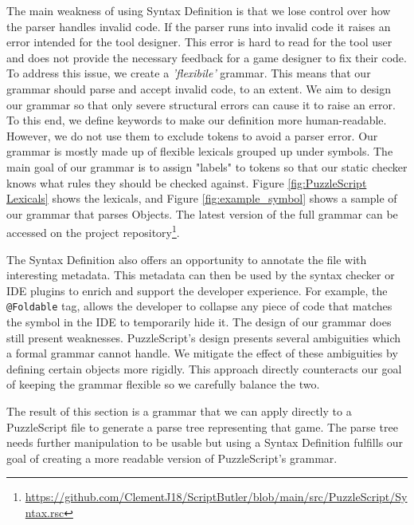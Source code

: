 The main weakness of using Syntax Definition is that we lose control over how the parser handles invalid code. If the parser runs into invalid code it raises an error intended for the tool designer. This error is hard to read for the tool user and does not provide the necessary feedback for a game designer to fix their code. To address this issue, we create a \emph{'flexibile'} grammar. This means that our grammar should parse and accept invalid code, to an extent. We aim to design our grammar so that only severe structural errors can cause it to raise an error. To this end, we define keywords to make our definition more human-readable. However, we do not use them to exclude tokens to avoid a parser error. Our grammar is mostly made up of flexible lexicals grouped up under symbols. The main goal of our grammar is to assign "labels" to tokens so that our static checker knows what rules they should be checked against. Figure \ref{fig:PuzzleScript Lexicals} shows the lexicals, and Figure \ref{fig:example_symbol} shows a sample of our grammar that parses Objects. The latest version of the full grammar can be accessed on the project repository\footnote{\url{https://github.com/ClementJ18/ScriptButler/blob/main/src/PuzzleScript/Syntax.rsc}}.

The Syntax Definition also offers an opportunity to annotate the file with interesting metadata. This metadata can then be used by the syntax checker or IDE plugins to enrich and support the developer experience. For example, the \texttt{@Foldable} tag, allows the developer to collapse any piece of code that matches the symbol in the IDE to temporarily hide it. The design of our grammar does still present weaknesses. PuzzleScript's design presents several ambiguities which a formal grammar cannot handle. We mitigate the effect of these ambiguities by defining certain objects more rigidly. This approach directly counteracts our goal of keeping the grammar flexible so we carefully balance the two. 

The result of this section is a grammar that we can apply directly to a PuzzleScript file to generate a parse tree representing that game. The parse tree needs further manipulation to be usable but using a Syntax Definition fulfills our goal of creating a more readable version of PuzzleScript's grammar.

